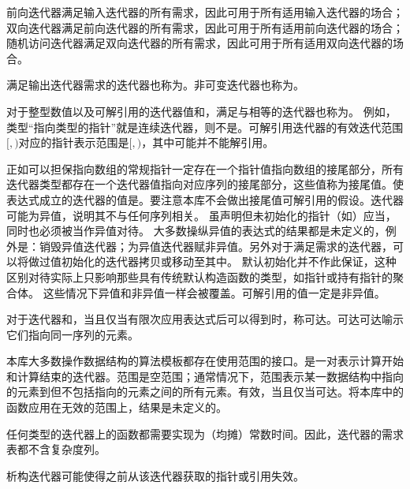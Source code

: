 \pnum
前向迭代器满足输入迭代器的所有需求，因此可用于所有适用输入迭代器的场合；双向迭代器满足前向迭代器的所有需求，因此可用于所有适用前向迭代器的场合；随机访问迭代器满足双向迭代器的所有需求，因此可用于所有适用双向迭代器的场合。

\pnum
满足输出迭代器需求的迭代器也称为。非可变迭代器也称为。

\pnum
对于整型数值以及可解引用的迭代器值和，满足与相等的迭代器也称为。
\enternote
例如，类型“指向类型的指针”就是连续迭代器，则不是。可解引用迭代器的有效迭代范围$[$$, $$)$对应的指针表示范围是$[$$, $$)$，其中可能并不能解引用。
\exitnote

\pnum
正如可以担保指向数组的常规指针一定存在一个指针值指向数组的接尾部分，所有迭代器类型都存在一个迭代器值指向对应序列的接尾部分，这些值称为{接尾}值。使表达式成立的迭代器的值是。要注意本库不会做出接尾值可解引用的假设。迭代器可能为异值，说明其不与任何序列相关。
\enterexample
虽声明但未初始化的指针（如）应当，同时也必须被当作异值对待。
\exitexample
大多数操纵异值的表达式的结果都是未定义的，例外是：销毁异值迭代器；为异值迭代器赋非异值。另外对于满足需求的迭代器，可以将做过值初始化的迭代器拷贝或移动至其中。
\enternote
默认初始化并不作此保证，这种区别对待实际上只影响那些具有传统默认构造函数的类型，如指针或持有指针的聚合体。
\exitnote
这些情况下异值和非异值一样会被覆盖。可解引用的值一定是非异值。

\pnum
对于迭代器和，当且仅当有限次应用表达式后可以得到时，称可达。可达可达喻示它们指向同一序列的元素。

\pnum
本库大多数操作数据结构的算法模板都存在使用范围的接口。是一对表示计算开始和计算结束的迭代器。范围是空范围；通常情况下，范围表示某一数据结构中指向的元素到但不包括指向的元素之间的所有元素。有效，当且仅当可达。将本库中的函数应用在无效的范围上，结果是未定义的。

\pnum
任何类型的迭代器上的函数都需要实现为（均摊）常数时间。因此，迭代器的需求表都不含复杂度列。

\pnum
析构迭代器可能使得之前从该迭代器获取的指针或引用失效。

